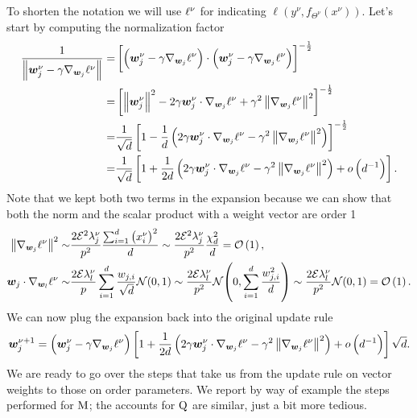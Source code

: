 To shorten the notation we will use \(\ell^\nu\) for indicating \(\ell(y^{\nu},f_{\Theta^{\nu}}(x^{\nu}))\).
Let's start by computing the normalization factor
\[\begin{split}
  \frac{1}{\left\|{\boldsymbol{w}}^{\nu}_j - \gamma \nabla_{{\boldsymbol{w}}_j}{\ell^\nu}\right\|} =&
    \left[\left({\boldsymbol{w}}^{\nu}_j - \gamma \nabla_{{\boldsymbol{w}}_j}{\ell^\nu}\right)\cdot\left({\boldsymbol{w}}^{\nu}_j - \gamma \nabla_{{\boldsymbol{w}}_j}{\ell^\nu}\right)\right]^{-\frac12} \\
    =&\left[\left\|{\boldsymbol{w}}^{\nu}_j\right\|^2 - 2\gamma{\boldsymbol{w}}^{\nu}_j\cdot \nabla_{{\boldsymbol{w}}_j}{\ell^\nu}+\gamma^2\left\|\nabla_{{\boldsymbol{w}}_j}{\ell^\nu}\right\|^2\right]^{-\frac12} \\
    =&\frac{1}{\sqrt{d}}\left[1- \frac1d\left(2\gamma{\boldsymbol{w}}^{\nu}_j\cdot \nabla_{{\boldsymbol{w}}_j}{\ell^\nu}-\gamma^2\left\|\nabla_{{\boldsymbol{w}}_j}{\ell^\nu}\right\|^2\right)\right]^{-\frac12} \\
    =&\frac{1}{\sqrt{d}}\left[1+ \frac{1}{2d}\left(2\gamma{\boldsymbol{w}}^{\nu}_j\cdot \nabla_{{\boldsymbol{w}}_j}{\ell^\nu}-\gamma^2\left\|\nabla_{{\boldsymbol{w}}_j}{\ell^\nu}\right\|^2\right)+o\left(d^{-1}\right)\right].
 \end{split}\]
Note that we kept both two terms in the expansion because we can show that both the norm and the scalar product with a weight vector are order 1
\[\begin{split}
  \left\|\nabla_{{\boldsymbol{w}}_j}{\ell^\nu}\right\|^2 \sim&
    \frac{2\mathcal{E}^2\lambda^\nu_j}{p^2} \frac{\sum_{i=1}^d \left(x^\nu_i\right)^2}{d}\sim
    \frac{2\mathcal{E}^2\lambda^\nu_j}{p^2}\frac{\chi^2_d}{d} = \mathcal O\left(1\right),\\
  {\boldsymbol{w}}_j\cdot\nabla_{{\boldsymbol{w}}_l}{\ell^\nu} \sim&
    \frac{2\mathcal{E}\lambda^\nu_l}{p}\sum_{i=1}^d\frac{w_{j,i}}{\sqrt{d}}\mathcal{N}{(0,1)} \sim
    \frac{2\mathcal{E}\lambda^\nu_l}{p^2}\mathcal{N}{\left(0,\sum_{i=1}^d\frac{w^2_{j,i}}{d}\right)} \sim
    \frac{2\mathcal{E}\lambda^\nu_l}{p^2}\mathcal{N}{\left(0,1\right)}= \mathcal O\left(1\right).
\end{split}\]
We can now plug the expansion back into the original update rule
\[
  {\boldsymbol{w}}^{\nu+1}_j =\left({\boldsymbol{w}}^{\nu}_j - \gamma \nabla_{{\boldsymbol{w}}_j}{\ell^\nu}\right)\left[1+ \frac{1}{2d}\left(2\gamma{\boldsymbol{w}}^{\nu}_j\cdot \nabla_{{\boldsymbol{w}}_j}{\ell^\nu}-\gamma^2\left\|\nabla_{{\boldsymbol{w}}_j}{\ell^\nu}\right\|^2\right)+o\left(d^{-1}\right)\right]\sqrt{d}.
\]
We are ready to go over the steps that take us from the update rule on vector weights
to those on order parameters. We report by way of example the steps performed for \(\mathrm{M}\);
the accounts for \(\mathrm{Q}\) are similar, just a bit more tedious.
